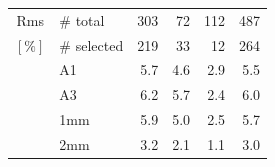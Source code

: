 \begin{table}[!thbp]
\begin{center}
\begin{tabular}{clrrrr}
  \hline
  \noalign{\smallskip}
  Rms  &  $\#$ total    &  303   &  72     &   112    &    487   \\
  $[\%]$ &  $\#$ selected &  219   &  33     &    12    &    264   \\
       &  A1            &  5.7   &  4.6    &   2.9    &    5.5   \\
       &  A3            &  6.2   &  5.7    &   2.4    &    6.0   \\
       &  1mm           &  5.9   &  5.0    &   2.5    &    5.7   \\
       &  2mm           &  3.2   &  2.1    &   1.1    &    3.0   \\  
\hline
\end{tabular}
\end{center}
\end{table}


